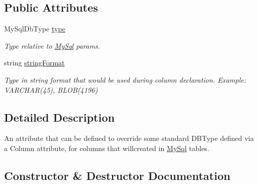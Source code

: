 \subsection*{Public Attributes}
\begin{DoxyCompactItemize}
\item 
My\+Sql\+Db\+Type \mbox{\hyperlink{class_uniform_data_operator_1_1_sql_1_1_my_sql_1_1_markup_1_1_my_sql_d_b_type_override_attribute_ab2a4ea0d332bbef5fcda9c1be1a568c9}{type}}
\begin{DoxyCompactList}\small\item\em Type relative to \mbox{\hyperlink{namespace_uniform_data_operator_1_1_sql_1_1_my_sql}{My\+Sql}} params. \end{DoxyCompactList}\item 
string \mbox{\hyperlink{class_uniform_data_operator_1_1_sql_1_1_my_sql_1_1_markup_1_1_my_sql_d_b_type_override_attribute_a7410daaecf6cc40b01fd9ed17c0d02aa}{string\+Format}}
\begin{DoxyCompactList}\small\item\em Type in string format that would be used during column declaration. Example\+: V\+A\+R\+C\+H\+A\+R(45), B\+L\+O\+B(4196) \end{DoxyCompactList}\end{DoxyCompactItemize}


\subsection{Detailed Description}
An attribute that can be defined to override some standard {\ttfamily D\+B\+Type} defined via a {\ttfamily Column} attribute, for columns that willcreated in \mbox{\hyperlink{namespace_uniform_data_operator_1_1_sql_1_1_my_sql}{My\+Sql}} tables. 



\subsection{Constructor \& Destructor Documentation}
\mbox{\label{class_uniform_data_operator_1_1_sql_1_1_my_sql_1_1_markup_1_1_my_sql_d_b_type_override_attribute_aa74bbebc2d24175c5789db6c59994150}} 
